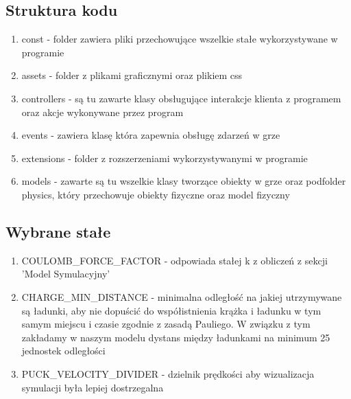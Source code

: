 \documentclass{article}
\begin{document}
\subsection{Struktura kodu}
\begin{enumerate}
    \item const - folder zawiera pliki przechowujące wszelkie stałe wykorzystywane w programie
    \item assets - folder z plikami graficznymi oraz plikiem css
    \item controllers - są tu zawarte klasy obsługujące interakcje klienta z programem oraz akcje wykonywane przez program
    \item events - zawiera klasę która zapewnia obsługę zdarzeń w grze
    \item extensions - folder z rozszerzeniami wykorzystywanymi w programie
    \item models - zawarte są tu wszelkie klasy tworzące obiekty w grze oraz podfolder physics, który przechowuje obiekty fizyczne oraz model fizyczny
\end{enumerate}
\subsection{Wybrane stałe}
\begin{enumerate}
    \item COULOMB\_FORCE\_FACTOR - odpowiada stałej k z obliczeń z sekcji 'Model Symulacyjny'
    \item CHARGE\_MIN\_DISTANCE - minimalna odległość na jakiej utrzymywane są ładunki, aby nie dopuścić do współistnienia krążka i ładunku w tym samym miejscu i czasie zgodnie z zasadą Pauliego. W związku z tym zakładamy w naszym modelu dystans między ładunkami na minimum 25 jednostek odległości
    \item PUCK\_VELOCITY\_DIVIDER - dzielnik prędkości aby wizualizacja symulacji była lepiej dostrzegalna
\end{enumerate}

\clearpage
\end{document}
